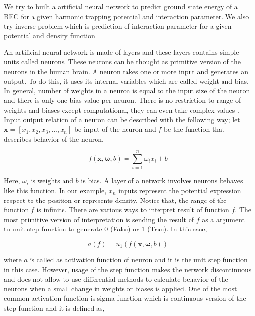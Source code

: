\documentclass[a4paper,times,12pt]{article}
\begin{document}
We try to built a artificial neural network to predict ground state energy of a BEC for a given harmonic trapping potential and interaction parameter. We also try inverse problem which is prediction of interaction parameter for a given potential and density function. 

An artificial neural network is made of layers and these layers contains simple units called neurons. These neurons can be thought as primitive version of the neurons in the human brain. A neuron takes one or more input and generates an output. To do this, it uses its internal variables which are called weight and bias. In general, number of weights in a neuron is equal to the input size of the neuron and there is only one bias value per neuron. There is no restriction to range of weights and biases except computational, they can even take complex values \cite{zimmermann2011comparison}. Input output relation of a neuron can be described with the following way; let $\boldsymbol{x} = [x_1, x_2, x_3, ..., x_n]$ be input of the neuron and $f$ be the function that describes behavior of the neuron. 

\begin{equation}
\label{eq:NU_neuron}
f(\boldsymbol{x}, \boldsymbol{\omega}, b) = \sum\limits_{i = 1}^n \omega_i x_i + b
\end{equation}

\noindent Here, $\omega_i$ is weights and $b$ is bias. A layer of a network involves neurons behaves like this function. In our example, $x_n$ inputs represent the potential expression respect to the position or represents density. Notice that, the range of the function $f$ is infinite. There are various ways to interpret result of function $f$. The most primitive version of interpretation is sending the result of $f$ as a argument to unit step function to generate 0 (False) or 1 (True). In this case, 

\begin{equation}
\label{eq:NU_step_function}
a(f) = u_1(f(\boldsymbol{x}, \boldsymbol{\omega}, b))
\end{equation}

\noindent where $a$ is called as activation function of neuron and it is the unit step function in this case. However, usage of the step function makes the network discontinuous and does not allow to use differential methods to calculate behavior of the neurons when a small change in weights or biases is applied. One of the most common activation function is sigma function which is continuous version of the step function and it is defined as,
\end{document}
